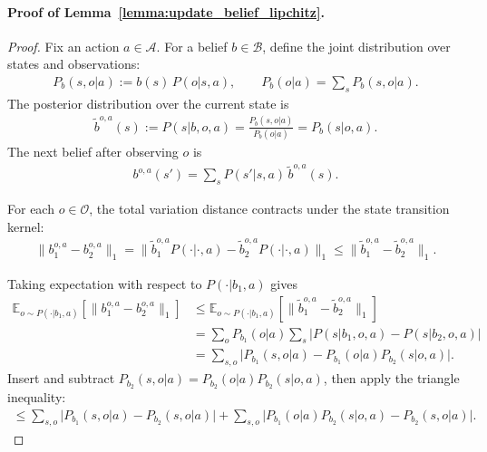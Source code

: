 \documentclass[twoside]{article}
\begin{document}
\paragraph{Proof of Lemma~\ref{lemma:update_belief_lipchitz}.}
\begin{proof}
Fix an action $a\in\mathcal A$. For a belief $b\in\mathcal B$, define the 
joint distribution over states and observations:
\begin{align*}
P_b(s,o| a) := b(s)\,P(o| s,a), \qquad 
P_b(o| a) = \sum_s P_b(s,o| a).
\end{align*}
The posterior distribution over the current state is
\begin{align*}
\tilde b^{o,a}(s) := P(s| b,o,a) 
= \frac{P_b(s,o| a)}{P_b(o| a)}=P_b(s| o,a).
\end{align*}
The next belief after observing $o$ is
\begin{align*}
b^{o,a}(s') = \sum_{s} P(s'| s,a)\,\tilde b^{o,a}(s).
\end{align*}

For each $o\in\mathcal O$, the total variation distance contracts under the 
state transition kernel:
\begin{align*}
\|b^{o,a}_1-b^{o,a}_2\|_1
= \|\tilde b^{o,a}_1 P(\cdot| \cdot,a) 
   - \tilde b^{o,a}_2 P(\cdot| \cdot,a)\|_1
\le \|\tilde b^{o,a}_1-\tilde b^{o,a}_2\|_1.
\end{align*}
 
Taking expectation with respect to $P(\cdot| b_1,a)$ gives
\begin{align*}
\mathbb E_{o\sim P(\cdot| b_1,a)}
  [\|b^{o,a}_1-b^{o,a}_2\|_1] 
&\le 
\mathbb E_{o\sim P(\cdot| b_1,a)}
  [\|\tilde b^{o,a}_1-\tilde b^{o,a}_2\|_1] \\
&=
\sum_o P_{b_1}(o| a)\sum_s
   \big|P(s| b_1,o,a)-P(s| b_2,o,a)\big| \\
&= \sum_{s,o}\big|
   P_{b_1}(s,o| a) - P_{b_1}(o| a) P_{b_2}(s| o,a)\big|.
\end{align*}
Insert and subtract $P_{b_2}(s,o| a)=P_{b_2}(o| a) P_{b_2}(s| o,a)$, then apply the triangle inequality:
\begin{align*}
\le \sum_{s,o}\big|P_{b_1}(s,o| a)-P_{b_2}(s,o| a)\big|
   + \sum_{s,o} \big|P_{b_1}(o| a)P_{b_2}(s| o,a)-P_{b_2}(s,o| a)\big|.
\end{align*}


\end{proof}
\end{document}
